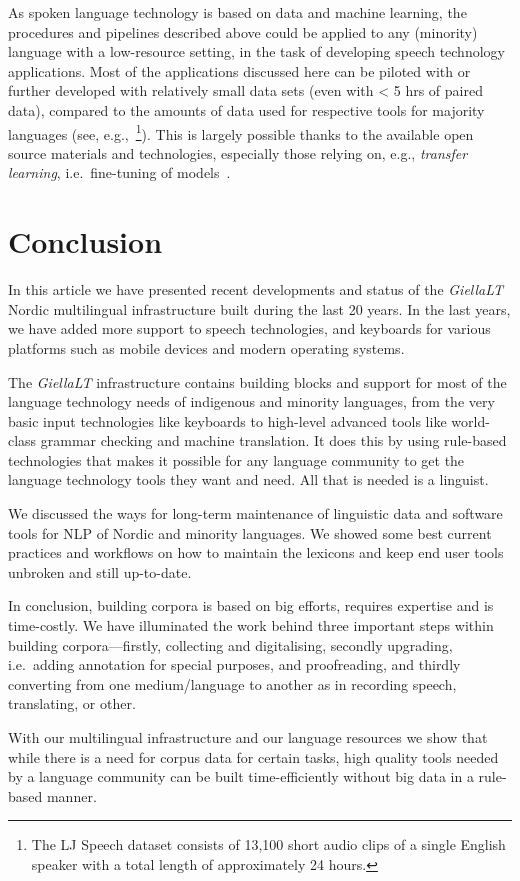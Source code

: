\documentclass[free]{flammie}
\begin{document}
As spoken language technology is based on data and machine learning, the
procedures and pipelines described above could be applied to any (minority)
language with a low-resource setting, in the task of developing speech
technology applications.  Most of the applications discussed here can be piloted
with or further developed with relatively small data sets (even with < 5 hrs of
paired data), compared to the amounts of data used for respective tools for
majority languages (see, e.g.,~\cite{ito2017lj}\footnote{The LJ Speech
dataset consists of 13,100 short audio clips of a single English speaker with a
total length of approximately 24 hours.}).  This is largely possible thanks to
the available open source materials and technologies, especially those relying
on, e.g., \textit{transfer learning}, i.e.\ fine-tuning of
models~\cite{fang2019towards}.

\section{Conclusion}


In this article we have presented recent developments and status of the
\textit{GiellaLT} Nordic multilingual infrastructure built during the last 20
years.  In the last years, we have added more support to speech technologies,
and keyboards for various platforms such as mobile devices and modern operating
systems.

The \textit{GiellaLT} infrastructure contains building blocks and support for
most of the language technology needs of indigenous and minority languages, from
the very basic input technologies like keyboards to high-level advanced tools
like world-class grammar checking and machine translation. It does this by using
rule-based technologies that makes it possible for any language community to get
the language technology tools they want and need.  All that is needed is a
linguist.


We discussed the ways for long-term maintenance of linguistic data and software
tools for NLP of Nordic and minority languages.  We showed some best current
practices and workflows on how to maintain the lexicons and keep end user tools
unbroken and still up-to-date.


In conclusion, building corpora is based on big efforts, requires expertise and
is time-costly.  We have illuminated the work behind three important steps
within building corpora---firstly, collecting and digitalising, secondly
upgrading, i.e.\ adding annotation for special purposes, and proofreading, and
thirdly converting from one medium/language to another as in  recording speech,
translating, or other.

With our multilingual infrastructure and our language resources we show that
while there is a need for corpus data for certain tasks, high quality tools
needed by a language community can be built time-efficiently without big data in
a rule-based manner.





\end{document}
